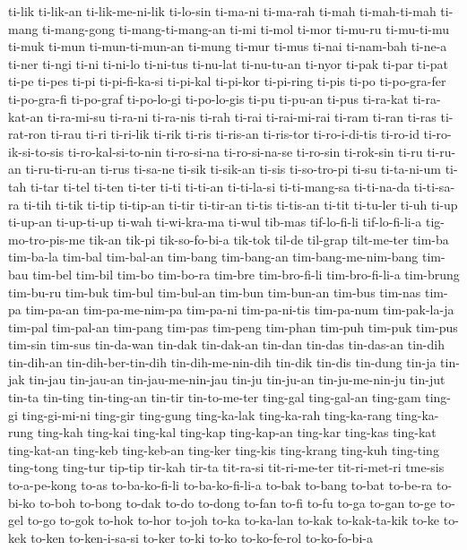 {ti-lik ti-lik-an ti-lik-me-ni-lik ti-lo-sin ti-ma-ni ti-ma-rah ti-mah
ti-mah-ti-mah ti-mang ti-mang-gong ti-mang-ti-mang-an ti-mi ti-mol ti-mor
ti-mu-ru ti-mu-ti-mu ti-muk ti-mun ti-mun-ti-mun-an ti-mung ti-mur ti-mus
ti-nai ti-nam-bah ti-ne-a ti-ner ti-ngi ti-ni ti-ni-lo ti-ni-tus ti-nu-lat
ti-nu-tu-an ti-nyor ti-pak ti-par ti-pat ti-pe ti-pes ti-pi ti-pi-fi-ka-si
ti-pi-kal ti-pi-kor ti-pi-ring ti-pis ti-po ti-po-gra-fer ti-po-gra-fi
ti-po-graf ti-po-lo-gi ti-po-lo-gis ti-pu ti-pu-an ti-pus ti-ra-kat
ti-ra-kat-an ti-ra-mi-su ti-ra-ni ti-ra-nis ti-rah ti-rai ti-rai-mi-rai
ti-ram ti-ran ti-ras ti-rat-ron ti-rau ti-ri ti-ri-lik ti-rik ti-ris
ti-ris-an ti-ris-tor ti-ro-i-di-tis ti-ro-id ti-ro-ik-si-to-sis
ti-ro-kal-si-to-nin ti-ro-si-na ti-ro-si-na-se ti-ro-sin ti-rok-sin ti-ru
ti-ru-an ti-ru-ti-ru-an ti-rus ti-sa-ne ti-sik ti-sik-an ti-sis
ti-so-tro-pi ti-su ti-ta-ni-um ti-tah ti-tar ti-tel ti-ten ti-ter ti-ti
ti-ti-an ti-ti-la-si ti-ti-mang-sa ti-ti-na-da ti-ti-sa-ra ti-tih ti-tik
ti-tip ti-tip-an ti-tir ti-tir-an ti-tis ti-tis-an ti-tit ti-tu-ler ti-uh
ti-up ti-up-an ti-up-ti-up ti-wah ti-wi-kra-ma ti-wul tib-mas tif-lo-fi-li
tif-lo-fi-li-a tig-mo-tro-pis-me tik-an tik-pi tik-so-fo-bi-a tik-tok
til-de til-grap tilt-me-ter tim-ba tim-ba-la tim-bal tim-bal-an tim-bang
tim-bang-an tim-bang-me-nim-bang tim-bau tim-bel tim-bil tim-bo tim-bo-ra
tim-bre tim-bro-fi-li tim-bro-fi-li-a tim-brung tim-bu-ru tim-buk tim-bul
tim-bul-an tim-bun tim-bun-an tim-bus tim-nas tim-pa tim-pa-an
tim-pa-me-nim-pa tim-pa-ni tim-pa-ni-tis tim-pa-num tim-pak-la-ja tim-pal
tim-pal-an tim-pang tim-pas tim-peng tim-phan tim-puh tim-puk tim-pus
tim-sin tim-sus tin-da-wan tin-dak tin-dak-an tin-dan tin-das tin-das-an
tin-dih tin-dih-an tin-dih-ber-tin-dih tin-dih-me-nin-dih tin-dik tin-dis
tin-dung tin-ja tin-jak tin-jau tin-jau-an tin-jau-me-nin-jau tin-ju
tin-ju-an tin-ju-me-nin-ju tin-jut tin-ta tin-ting tin-ting-an tin-tir
tin-to-me-ter ting-gal ting-gal-an ting-gam ting-gi ting-gi-mi-ni ting-gir
ting-gung ting-ka-lak ting-ka-rah ting-ka-rang ting-ka-rung ting-kah
ting-kai ting-kal ting-kap ting-kap-an ting-kar ting-kas ting-kat
ting-kat-an ting-keb ting-keb-an ting-ker ting-kis ting-krang ting-kuh
ting-ting ting-tong ting-tur tip-tip tir-kah tir-ta tit-ra-si
tit-ri-me-ter tit-ri-met-ri tme-sis to-a-pe-kong to-as to-ba-ko-fi-li
to-ba-ko-fi-li-a to-bak to-bang to-bat to-be-ra to-bi-ko to-boh to-bong
to-dak to-do to-dong to-fan to-fi to-fu to-ga to-gan to-ge to-gel to-go
to-gok to-hok to-hor to-joh to-ka to-ka-lan to-kak to-kak-ta-kik to-ke
to-kek to-ken to-ken-i-sa-si to-ker to-ki to-ko to-ko-fe-rol to-ko-fo-bi-a
}
